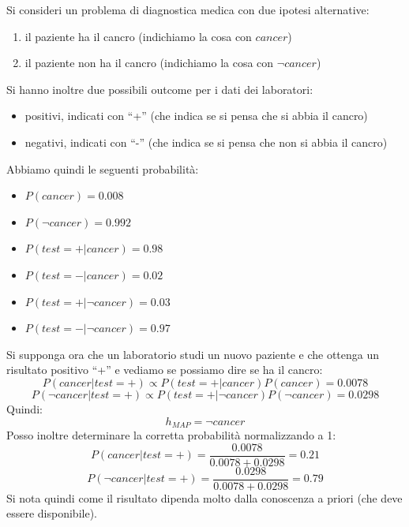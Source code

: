 \documentclass[a4paper,12pt, oneside]{book}
\begin{document}
\begin{esercizio}
  Si consideri un problema di diagnostica medica con due ipotesi alternative:
  \begin{enumerate}
    \item il paziente ha il cancro (indichiamo la cosa con $cancer$)
    \item il paziente non ha il cancro (indichiamo la cosa con $\neg cancer$)
  \end{enumerate}
  Si hanno inoltre due possibili outcome per i dati dei laboratori:
  \begin{itemize}
    \item positivi, indicati con ``+'' (che indica se si pensa che si abbia il
    cancro)
    \item negativi, indicati con ``-'' (che indica se si pensa che non si abbia
    il cancro)
  \end{itemize}
  Abbiamo quindi le seguenti probabilità:
  \begin{itemize}
    \item $P(cancer)=0.008$
    \item $P(\neg cancer)=0.992$
    \item $P(test=+|cancer)=0.98$
    \item $P(test=-|cancer)=0.02$
    \item $P(test=+|\neg cancer)=0.03$
    \item $P(test=-|\neg cancer)=0.97$
  \end{itemize}
  Si supponga ora che un laboratorio studi un nuovo paziente e che ottenga un
  risultato positivo ``+'' e vediamo se possiamo dire se ha il cancro:
  \[P(cancer|test=+)\varpropto P(test=+|cancer)P(cancer)=0.0078\]
  \[P(\neg cancer|test=+)\varpropto P(test=+|\neg cancer)P(\neg cancer)=0.0298\]
  Quindi:
  \[h_{MAP}=\neg cancer\]
  Posso inoltre determinare la corretta probabilità normalizzando a 1:
  \[P(cancer|test=+)=\frac{0.0078}{0.0078+0.0298}=0.21\]
  \[P(\neg cancer|test=+)=\frac{0.0298}{0.0078+0.0298}=0.79\]
  Si nota quindi come il risultato dipenda molto dalla conoscenza a priori (che
  deve essere disponibile).
\end{esercizio}
\end{document}
